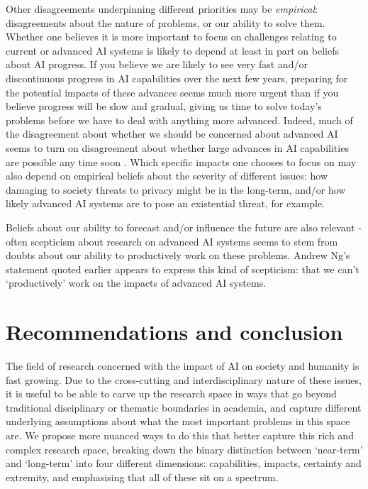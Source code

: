 \documentclass[sigconf]{acmart}
\begin{document}
Other disagreements underpinning different priorities may be \textit{empirical}: disagreements about the nature of problems, or our ability to solve them. Whether one believes it is more important to focus on challenges relating to current or advanced AI systems is likely to depend at least in part on beliefs about AI progress. If you believe we are likely to see very fast and/or discontinuous progress in AI capabilities over the next few years, preparing for the potential impacts of these advances seems much more urgent than if you believe progress will be slow and gradual, giving us time to solve today's problems before we have to deal with anything more advanced. Indeed, much of the disagreement about whether we should be concerned about advanced AI seems to turn on disagreement about whether large advances in AI capabilities are possible any time soon \cite{brockman2019,ford2019}. Which specific impacts one chooses to focus on may also depend on empirical beliefs about the severity of different issues: how damaging to society threats to privacy might be in the long-term, and/or how likely advanced AI systems are to pose an existential threat, for example.

Beliefs about our ability to forecast and/or influence the future are also relevant - often scepticism about research on advanced AI systems seems to stem from doubts about our ability to productively work on these problems. Andrew Ng's statement quoted earlier \cite{garling_why_2015} appears to express this kind of scepticism: that we can't `productively' work on the impacts of advanced AI systems.

\section{Recommendations and conclusion}

The field of research concerned with the impact of AI on society and humanity is fast growing. Due to the cross-cutting and interdisciplinary nature of these issues, it is useful to be able to carve up the research space in ways that go beyond traditional disciplinary or thematic boundaries in academia, and capture different underlying assumptions about what the most important problems in this space are. We propose more nuanced ways to do this that better capture this rich and complex research space, breaking down the binary distinction between `near-term' and `long-term' into four different dimensions: capabilities, impacts, certainty and extremity, and emphasising that all of these sit on a spectrum.
\end{document}
